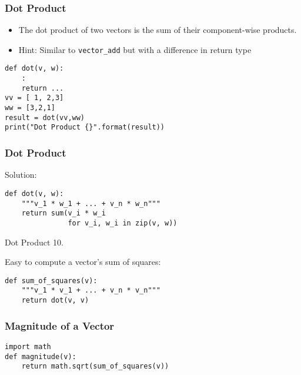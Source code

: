 \begin{frame}[fragile]\frametitle{Dot Product}
\begin{itemize}
\item  The dot product of two vectors is the sum of their component-wise products. 
\item Hint: Similar to \lstinline|vector_add| but with a difference in return type
\end{itemize}
\begin{lstlisting}
def dot(v, w):
	:
	return ...
vv = [ 1, 2,3]
ww = [3,2,1]
result = dot(vv,ww)
print("Dot Product {}".format(result))
\end{lstlisting}
\end{frame}

\begin{frame}[fragile]\frametitle{Dot Product}
Solution:
\begin{lstlisting}
def dot(v, w):
    """v_1 * w_1 + ... + v_n * w_n"""
    return sum(v_i * w_i
               for v_i, w_i in zip(v, w))
\end{lstlisting}
Dot Product 10.

Easy to compute a vector's sum of squares:
\begin{lstlisting}
def sum_of_squares(v):
    """v_1 * v_1 + ... + v_n * v_n"""
    return dot(v, v)
\end{lstlisting}
\end{frame}


\begin{frame}[fragile]\frametitle{Magnitude of a Vector}
\begin{lstlisting}
import math
def magnitude(v):
    return math.sqrt(sum_of_squares(v)) 
\end{lstlisting}
\end{frame}

